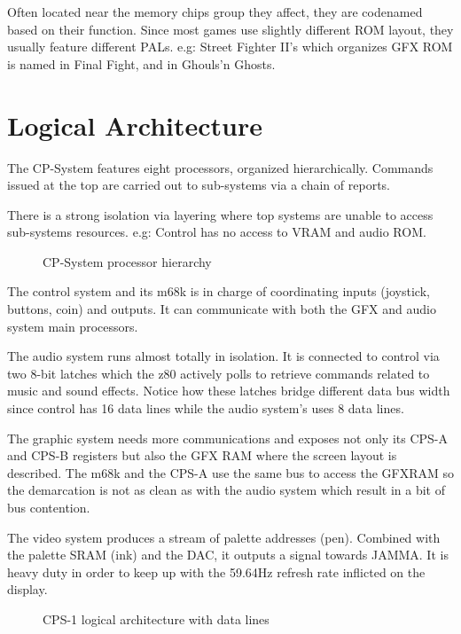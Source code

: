  Often located near the memory chips group they affect, they are codenamed based on their function. Since most games use slightly different ROM layout, they usually feature different PALs. e.g: Street Fighter II's  which organizes GFX ROM is named  in Final Fight, and  in Ghouls'n Ghosts.



\section{Logical Architecture}
The CP-System features eight processors, organized hierarchically. Commands issued at the top are carried out to sub-systems via a chain of reports. 

There is a strong isolation via layering where top systems are unable to access sub-systems resources. e.g: Control has no access to VRAM and audio ROM.

\begin{figure}[H]
  \caption*{CP-System processor hierarchy}
  \end{figure}


The control system and its m68k is in charge of coordinating inputs (joystick, buttons, coin) and outputs. It can communicate with both the GFX and audio system main processors.

The audio system runs almost totally in isolation. It is connected to control via two 8-bit latches which the z80 actively polls to retrieve commands related to music and sound effects. Notice how these latches bridge different data bus width since control has 16 data lines while the audio system's uses 8 data lines.

The graphic system needs more communications and exposes not only its CPS-A and CPS-B registers but also the GFX RAM where the screen layout is described. The m68k and the CPS-A use the same bus to access the GFXRAM so the demarcation is not as clean as with the audio system which result in a bit of bus contention.  

The video system produces a stream of palette addresses (pen). Combined with the palette SRAM (ink) and the DAC, it outputs a signal towards JAMMA.
It is heavy duty in order to keep up with the 59.64Hz refresh rate inflicted on the display.

\begin{figure}[H]
  \caption*{CPS-1 logical architecture with data lines}
  \label{cps1_arch}
  \end{figure}


